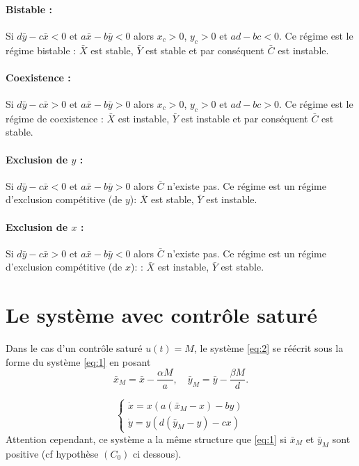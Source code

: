 \documentclass[a4paper,11pt,draft]{article}
\begin{document}
\paragraph{Bistable :}
Si $d\bar{y}-c\bar{x} <0$ et $a\bar{x}-b\bar{y} < 0$ alors $x_c>0$, $y_c>0$ et  $ad-bc<0$. Ce régime est le régime bistable :
$\bar{X}$ est stable, $\bar{Y}$ est stable et par conséquent $\bar{C}$ est instable.

\paragraph{Coexistence :}
Si $d\bar{y}-c\bar{x} >0$ et $a\bar{x}-b\bar{y} > 0$ alors $x_c>0$, $y_c>0$ et  $ad-bc>0$. Ce régime est le régime de coexistence :
$\bar{X}$ est instable, $\bar{Y}$ est instable et par conséquent $\bar{C}$ est stable.

\paragraph{Exclusion de $y$ :}
Si $d\bar{y}-c\bar{x} <0$ et $a\bar{x}-b\bar{y} > 0$ alors $\bar{C}$ n'existe pas. Ce régime est un régime d'exclusion compétitive (de $y$):
$\bar{X}$ est stable, $\bar{Y}$ est instable.

\paragraph{Exclusion de $x$ :}
Si $d\bar{y}-c\bar{x} >0$ et $a\bar{x}-b\bar{y} < 0$ alors $\bar{C}$ n'existe pas. Ce régime est  un régime d'exclusion compétitive (de $x$): :
$\bar{X}$ est instable, $\bar{Y}$ est stable.
\section{Le système avec contrôle saturé}
Dans le cas d'un contrôle saturé $u(t)=M$, le système \eqref{eq:2} se réécrit sous la forme du système \eqref{eq:1} en posant 
$$\bar{x}_M=\bar{x}-\frac{\alpha M}{a},\quad \bar{y}_M=\bar{y}-\frac{\beta M}{d}.$$

\begin{equation} \label{eq:3}
    \begin{cases}
        \dot{x}=x(a(\bar{x}_M-x)-by)\\
        \dot{y}=y(d(\bar{y}_M-y)-cx)
    \end{cases}
\end{equation}
Attention cependant, ce système a la même structure que \eqref{eq:1} si $\bar{x}_M$ et $\bar{y}_M$ sont positive (cf hypothèse $(C_0)$ ci dessous).
\end{document}
